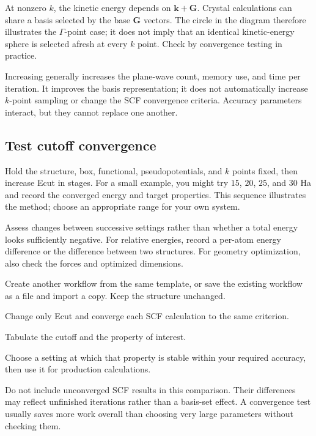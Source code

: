 

At nonzero $k$, the kinetic energy depends on $\mathbf k+\mathbf G$. Crystal calculations can share a basis selected by the base $\mathbf G$ vectors. The circle in the diagram therefore illustrates the $\Gamma$-point case; it does not imply that an identical kinetic-energy sphere is selected afresh at every $k$ point. Check  by convergence testing in practice.

Increasing  generally increases the plane-wave count, memory use, and time per iteration. It improves the basis representation; it does not automatically increase $k$-point sampling or change the SCF convergence criteria. Accuracy parameters interact, but they cannot replace one another.

\subsection{Test cutoff convergence}

Hold the structure, box, functional, pseudopotentials, and $k$ points fixed, then increase Ecut in stages. For a small example, you might try $15$, $20$, $25$, and $30$ Ha and record the converged energy and target properties. This sequence illustrates the method; choose an appropriate range for your own system.

Assess changes between successive settings rather than whether a total energy looks sufficiently negative. For relative energies, record a per-atom energy difference or the difference between two structures. For geometry optimization, also check the forces and optimized dimensions.

\begin{steps}
\item Create another workflow from the same template, or save the existing workflow as a  file and import a copy. Keep the structure unchanged.
\item Change only Ecut and converge each SCF calculation to the same criterion.
\item Tabulate the cutoff and the property of interest.
\item Choose a setting at which that property is stable within your required accuracy, then use it for production calculations.
\end{steps}

Do not include unconverged SCF results in this comparison. Their differences may reflect unfinished iterations rather than a basis-set effect. A convergence test usually saves more work overall than choosing very large parameters without checking them.


